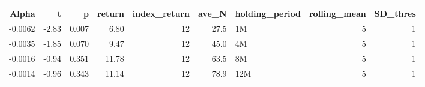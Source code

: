\begin{table}[ht]
\centering
\begin{tabular}{rrrrrrlrr}
  \hline
Alpha & t & p & return & index\_return & ave\_N & holding\_period & rolling\_mean & SD\_thres \\ 
  \hline
-0.0062 & -2.83 & 0.007 & 6.80 & 12 & 27.5 & 1M &  5 &  1 \\ 
  -0.0035 & -1.85 & 0.070 & 9.47 & 12 & 45.0 & 4M &  5 &  1 \\ 
  -0.0016 & -0.94 & 0.351 & 11.78 & 12 & 63.5 & 8M &  5 &  1 \\ 
  -0.0014 & -0.96 & 0.343 & 11.14 & 12 & 78.9 & 12M &  5 &  1 \\ 
   \hline
\end{tabular}
\end{table}

